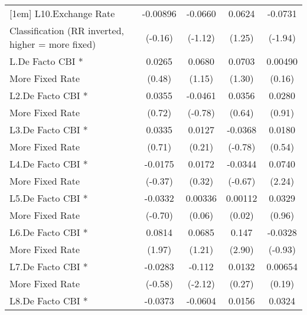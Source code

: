 {\begin{tabular}{l*{4}{c}}
[1em]
L10.Exchange Rate   &    -0.00896         &     -0.0660         &      0.0624         &     -0.0731         \\
Classification (RR inverted, higher = more fixed)&     (-0.16)         &     (-1.12)         &      (1.25)         &     (-1.94)         \\
[1em]
L.De Facto CBI *    &      0.0265         &      0.0680         &      0.0703         &     0.00490         \\
More Fixed Rate     &      (0.48)         &      (1.15)         &      (1.30)         &      (0.16)         \\
[1em]
L2.De Facto CBI *   &      0.0355         &     -0.0461         &      0.0356         &      0.0280         \\
More Fixed Rate     &      (0.72)         &     (-0.78)         &      (0.64)         &      (0.91)         \\
[1em]
L3.De Facto CBI *   &      0.0335         &      0.0127         &     -0.0368         &      0.0180         \\
More Fixed Rate     &      (0.71)         &      (0.21)         &     (-0.78)         &      (0.54)         \\
[1em]
L4.De Facto CBI *   &     -0.0175         &      0.0172         &     -0.0344         &      0.0740\sym{*}  \\
More Fixed Rate     &     (-0.37)         &      (0.32)         &     (-0.67)         &      (2.24)         \\
[1em]
L5.De Facto CBI *   &     -0.0332         &     0.00336         &     0.00112         &      0.0329         \\
More Fixed Rate     &     (-0.70)         &      (0.06)         &      (0.02)         &      (0.96)         \\
[1em]
L6.De Facto CBI *   &      0.0814\sym{*}  &      0.0685         &       0.147\sym{**} &     -0.0328         \\
More Fixed Rate     &      (1.97)         &      (1.21)         &      (2.90)         &     (-0.93)         \\
[1em]
L7.De Facto CBI *   &     -0.0283         &      -0.112\sym{*}  &      0.0132         &     0.00654         \\
More Fixed Rate     &     (-0.58)         &     (-2.12)         &      (0.27)         &      (0.19)         \\
[1em]
L8.De Facto CBI *   &     -0.0373         &     -0.0604         &      0.0156         &      0.0324         \\

\end{tabular}}
